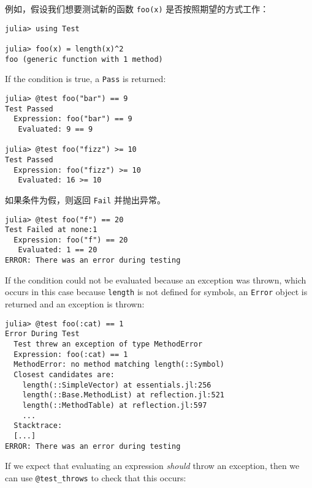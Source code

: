 例如，假设我们想要测试新的函数 \texttt{foo(x)} 是否按照期望的方式工作：




\begin{verbatim}
julia> using Test

julia> foo(x) = length(x)^2
foo (generic function with 1 method)
\end{verbatim}



If the condition is true, a \texttt{Pass} is returned:




\begin{verbatim}
julia> @test foo("bar") == 9
Test Passed
  Expression: foo("bar") == 9
   Evaluated: 9 == 9

julia> @test foo("fizz") >= 10
Test Passed
  Expression: foo("fizz") >= 10
   Evaluated: 16 >= 10
\end{verbatim}



如果条件为假，则返回 \texttt{Fail} 并抛出异常。




\begin{verbatim}
julia> @test foo("f") == 20
Test Failed at none:1
  Expression: foo("f") == 20
   Evaluated: 1 == 20
ERROR: There was an error during testing
\end{verbatim}



If the condition could not be evaluated because an exception was thrown, which occurs in this case because \texttt{length} is not defined for symbols, an \texttt{Error} object is returned and an exception is thrown:




\begin{verbatim}
julia> @test foo(:cat) == 1
Error During Test
  Test threw an exception of type MethodError
  Expression: foo(:cat) == 1
  MethodError: no method matching length(::Symbol)
  Closest candidates are:
    length(::SimpleVector) at essentials.jl:256
    length(::Base.MethodList) at reflection.jl:521
    length(::MethodTable) at reflection.jl:597
    ...
  Stacktrace:
  [...]
ERROR: There was an error during testing
\end{verbatim}



If we expect that evaluating an expression \emph{should} throw an exception, then we can use \texttt{@test\_throws} to check that this occurs:




